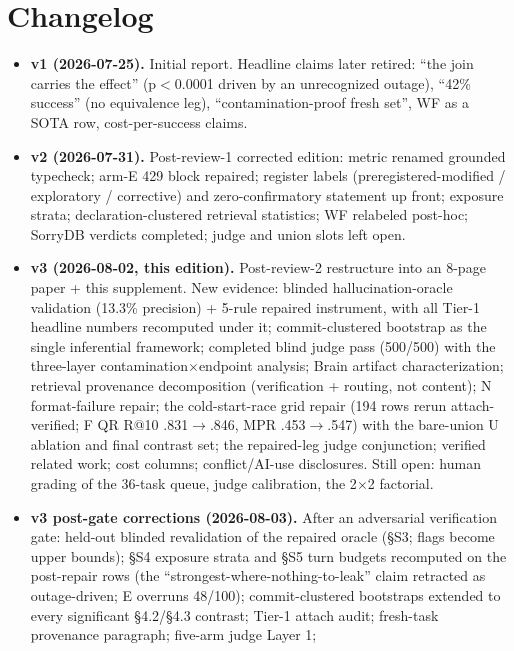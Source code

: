 \documentclass[10pt]{article}
\begin{document}
\section{Changelog}\label{s13}

\begin{itemize}
\item \textbf{v1 (2026-07-25).} Initial report. Headline claims later
  retired: ``the join carries the effect'' (p$<$0.0001 driven by an
  unrecognized outage), ``42\% success'' (no equivalence leg),
  ``contamination-proof fresh set'', WF as a SOTA row, cost-per-success
  claims.
\item \textbf{v2 (2026-07-31).} Post-review-1 corrected edition:
  metric renamed grounded typecheck; arm-E 429 block repaired; register
  labels (preregistered-modified / exploratory / corrective) and
  zero-confirmatory statement up front; exposure strata;
  declaration-clustered retrieval statistics; WF relabeled post-hoc;
  SorryDB verdicts completed; judge and union slots left open.
\item \textbf{v3 (2026-08-02, this edition).} Post-review-2
  restructure into an 8-page paper + this supplement. New evidence:
  blinded hallucination-oracle validation (13.3\% precision) + 5-rule
  repaired instrument, with all Tier-1 headline numbers recomputed
  under it; commit-clustered bootstrap as the single inferential
  framework; completed blind judge pass (500/500) with the three-layer
  contamination$\times$endpoint analysis; Brain artifact
  characterization; retrieval provenance decomposition (verification +
  routing, not content); N format-failure repair; the cold-start-race
  grid repair (194 rows rerun attach-verified; F QR R@10
  .831$\to$.846, MPR .453$\to$.547) with the bare-union U ablation and
  final contrast set; the repaired-leg judge conjunction; verified
  related work; cost columns; conflict/AI-use disclosures. Still open:
  human grading of the 36-task queue, judge calibration, the 2$\times$2
  factorial.
\item \textbf{v3 post-gate corrections (2026-08-03).} After an
  adversarial verification gate: held-out blinded revalidation of the
  repaired oracle (\S S3; flags become upper bounds); \S S4 exposure
  strata and \S S5 turn budgets recomputed on the post-repair rows
  (the ``strongest-where-nothing-to-leak'' claim retracted as
  outage-driven; E overruns 48/100); commit-clustered bootstraps
  extended to every significant \S 4.2/\S 4.3 contrast; Tier-1 attach
  audit; fresh-task provenance paragraph; five-arm judge Layer 1;

\end{itemize}
\end{document}
